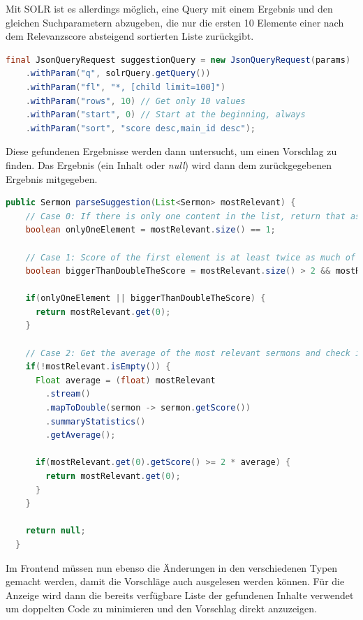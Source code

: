 Mit SOLR ist es allerdings möglich, eine Query mit einem Ergebnis und den gleichen Suchparametern abzugeben, die nur die ersten 10 Elemente einer nach dem Relevanzscore absteigend sortierten Liste zurückgibt.

\clearpage
\begin{lstlisting}[language=Java, label={code:SOLRSuggestionQuery}, title={SOLR Query für die Top 10 Ergebnisse, absteigend sortiert nach Relevanz \cite{solr-search2022}}]
  final JsonQueryRequest suggestionQuery = new JsonQueryRequest(params)
    .withParam("q", solrQuery.getQuery())
    .withParam("fl", "*, [child limit=100]")
    .withParam("rows", 10) // Get only 10 values
    .withParam("start", 0) // Start at the beginning, always
    .withParam("sort", "score desc,main_id desc");
\end{lstlisting}

Diese gefundenen Ergebnisse werden dann untersucht, um einen Vorschlag zu finden. Das Ergebnis (ein Inhalt oder \emph{null}) wird dann dem zurückgegebenen Ergebnis mitgegeben.

\begin{lstlisting}[language=Java, label={code:parseSuggestion}, title={Relevanteste Inhalte nach einem Vorschlag durchsuchen \cite{solr-search2022}}]
  public Sermon parseSuggestion(List<Sermon> mostRelevant) {
    // Case 0: If there is only one content in the list, return that as suggestion
    boolean onlyOneElement = mostRelevant.size() == 1;

    // Case 1: Score of the first element is at least twice as much of the second score
    boolean biggerThanDoubleTheScore = mostRelevant.size() > 2 && mostRelevant.get(0).getScore() >= 2 * mostRelevant.get(1).getScore();

    if(onlyOneElement || biggerThanDoubleTheScore) {
      return mostRelevant.get(0);
    }

    // Case 2: Get the average of the most relevant sermons and check if the first has at least twice as much of that
    if(!mostRelevant.isEmpty()) {
      Float average = (float) mostRelevant
        .stream()
        .mapToDouble(sermon -> sermon.getScore())
        .summaryStatistics()
        .getAverage();

      if(mostRelevant.get(0).getScore() >= 2 * average) {
        return mostRelevant.get(0);
      }
    }

    return null;
  }
\end{lstlisting}


\clearpage
Im Frontend müssen nun ebenso die Änderungen in den verschiedenen Typen gemacht werden, damit die Vorschläge auch ausgelesen werden können.
Für die Anzeige wird dann die bereits verfügbare Liste der gefundenen Inhalte verwendet um doppelten Code zu minimieren und den Vorschlag direkt anzuzeigen.



